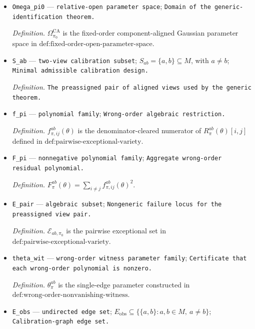 \documentclass{article}
\begin{document}
\begin{itemize}
  \par\smallskip\noindent\emph{Definition.} \(\theta=((B^{(a)})_{a\in M},(\Gamma_i)_{i\in V})\) is a coefficient-and-disturbance-covariance parameter with fixed common order \(\pi_0\).
  \item \texttt{Omega\_\allowbreak{}pi0} --- \texttt{relative-\allowbreak{}open parameter space}; \texttt{Domain of the generic-\allowbreak{}identification theorem.}
  \par\smallskip\noindent\emph{Definition.} \(\Omega_{\pi_0}^{\mathrm{CA}}\) is the fixed-order component-aligned Gaussian parameter space in \(\text{def:fixed-order-open-parameter-space}\).
  \item \texttt{S\_\allowbreak{}ab} --- \texttt{two-\allowbreak{}view calibration subset}; \(S_{ab}=\{a,b\}\subseteq M\), with \(a\ne b\); \texttt{Minimal admissible calibration design.}
  \par\smallskip\noindent\emph{Definition.} \texttt{The preassigned pair of aligned views used by the generic theorem.}
  \item \texttt{f\_\allowbreak{}pi} --- \texttt{polynomial family}; \texttt{Wrong-\allowbreak{}order algebraic restriction.}
  \par\smallskip\noindent\emph{Definition.} \(f_{\pi,ij}^{ab}(\theta)\) is the denominator-cleared numerator of \(R_\pi^{ab}(\theta)[i,j]\) defined in \(\text{def:pairwise-exceptional-variety}\).
  \item \texttt{F\_\allowbreak{}pi} --- \texttt{nonnegative polynomial family}; \texttt{Aggregate wrong-\allowbreak{}order residual polynomial.}
  \par\smallskip\noindent\emph{Definition.} \(F_\pi^{ab}(\theta)=\sum_{i\ne j}f_{\pi,ij}^{ab}(\theta)^2\).
  \item \texttt{E\_\allowbreak{}pair} --- \texttt{algebraic subset}; \texttt{Nongeneric failure locus for the preassigned view pair.}
  \par\smallskip\noindent\emph{Definition.} \(\mathcal E_{ab,\pi_0}\) is the pairwise exceptional set in \(\text{def:pairwise-exceptional-variety}\).
  \item \texttt{theta\_\allowbreak{}wit} --- \texttt{wrong-\allowbreak{}order witness parameter family}; \texttt{Certificate that each wrong-\allowbreak{}order polynomial is nonzero.}
  \par\smallskip\noindent\emph{Definition.} \(\theta_{\pi}^{ab}\) is the single-edge parameter constructed in \(\text{def:wrong-order-nonvanishing-witness}\).
  \item \texttt{E\_\allowbreak{}obs} --- \texttt{undirected edge set}; \(E_{\mathrm{obs}}\subseteq\{\{a,b\}:a,b\in M,\ a\ne b\}\); \texttt{Calibration-\allowbreak{}graph edge set.}

\end{itemize}
\end{document}
